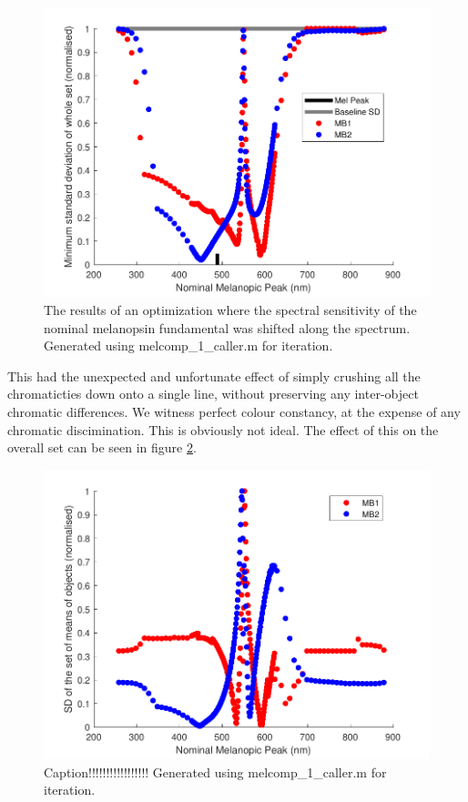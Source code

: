 \documentclass{article}
\begin{document}
\begin{figure}[ht]
    \centering
    \includegraphics{figs/opt.pdf}
    \caption{The results of an optimization where the spectral sensitivity of the nominal melanopsin fundamental was shifted along the spectrum. Generated using melcomp\_1\_caller.m for iteration.}
    \label{fig:opt}
\end{figure} 

This had the unexpected and unfortunate effect of simply crushing all the chromaticties down onto a single line, without preserving any inter-object chromatic differences. We witness perfect colour constancy, at the expense of any chromatic discimination. This is obviously not ideal. The effect of this on the overall set can be seen in figure \ref{fig:sdmeans}.

\begin{figure}[ht]
    \centering
    \includegraphics{figs/sdmeans.pdf}
    \caption{Caption!!!!!!!!!!!!!!!!! Generated using melcomp\_1\_caller.m for iteration.}
    \label{fig:sdmeans}
\end{figure} 
\end{document}
